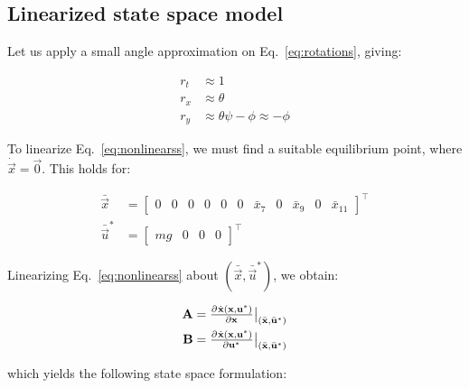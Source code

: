 \subsection{Linearized state space model}

Let us apply a small angle approximation on Eq.~\ref{eq:rotations}, giving:

\begin{equation}\label{eq:rotationsSAM}
\begin{split}
	r_t &\approx 1 \\
	r_x &\approx \theta \\
	r_y &\approx \theta\psi - \phi \approx -\phi
\end{split}
\end{equation}

To linearize Eq.~\ref{eq:nonlinearss}, we must find a suitable equilibrium point, where $\dot{\vec{x}} = \vec{0}$. This holds for:

\begin{equation}
\begin{split}
	\bar{\vec{x}} &= \begin{bmatrix}
		0 & 0 & 0 & 0 & 0 & 0 & \bar{x}_7 & 0 & \bar{x}_9 & 0 & \bar{x}_{11}
	\end{bmatrix}^\intercal \\
	\bar{\vec{u}}^* &= 
	\begin{bmatrix}
		mg & 0 & 0 & 0
	\end{bmatrix}^\intercal
\end{split}
\end{equation}

Linearizing Eq.~\ref{eq:nonlinearss} about $(\bar{\vec{x}}, \bar{\vec{u}}^*)$, we obtain:

\begin{equation}
\begin{split}
	\vec{A} &= \eval[1]{\pd{\dot{\vec{x}}(\vec{x},\vec{u}^*)}{\vec{x}}}_{(\bar{\vec{x}}, \bar{\vec{u}}^*)} \\
	\vec{B} &= \eval[1]{\pd{\dot{\vec{x}}(\vec{x},\vec{u}^*)}{{\vec{u}^*}}}_{(\bar{\vec{x}}, \bar{\vec{u}}^*)}
\end{split}
\end{equation}

which yields the following state space formulation:

